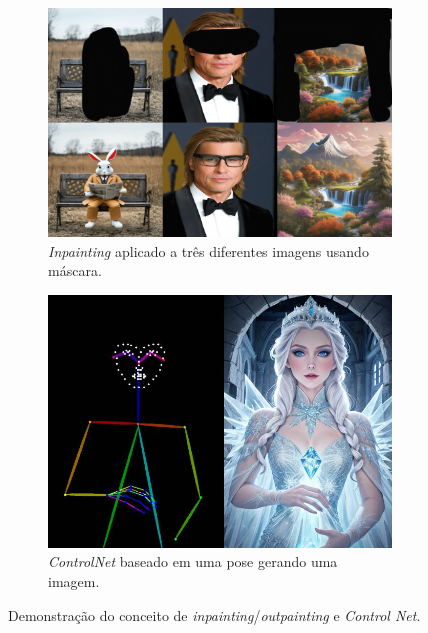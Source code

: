 \documentclass[12pt, %
openright, 
oneside, %
a4paper,    %
brazil]{facom-ufu-abntex2}
\begin{document}
\begin{figure}[H]
    \centering
    \begin{subfigure}{.46\textwidth}
      \centering
      \includegraphics[width=\linewidth]{inpaint-sample-1.png}
      \caption{\emph{Inpainting} aplicado a três diferentes imagens usando máscara.}
      \label{fig:InpaintingOutpaintingControlNetSub1}
    \end{subfigure}
    \begin{subfigure}{.417\textwidth}
      \centering
      \includegraphics[width=\linewidth]{controlnet-sample-1.jpg}
      \caption{\textit{ControlNet} baseado em uma pose gerando uma imagem.}
      \label{fig:InpaintingOutpaintingControlNetSub2}
    \end{subfigure}
    \caption{Demonstração do conceito de \emph{inpainting}/\emph{outpainting} e \textit{Control Net}.}
    \label{fig:InpaintingOutpaintingControlNet}
\end{figure}
\end{document}
